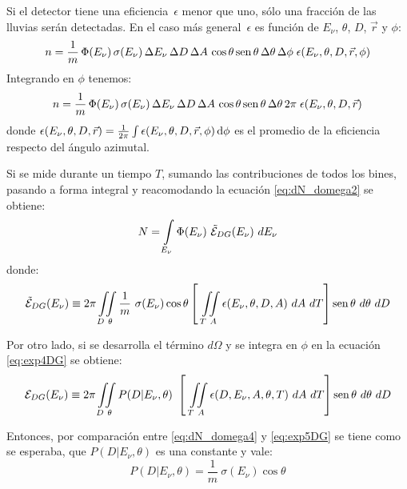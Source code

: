 	Si el detector tiene una eficiencia~$\epsilon$ menor que uno, sólo una fracción de las lluvias serán detectadas. En el caso más general~$\epsilon$ es función de $E_{\nu}$, $\theta$, $D$, $\vec{r}$ y $\phi$:
	\begin{equation}
	n = \frac{1}{m}\,\Phi(E_{\nu})\,\sigma(E_{\nu})\,\Delta E_{\nu}\,\Delta D\,\Delta A\,\cos\theta\operatorname{sen}\theta\,\Delta\theta\,\Delta\phi\;\epsilon(E_{\nu},\theta,D,\vec{r},\phi)
	\label{eq:dN_domega}
	\end{equation}
	Integrando en $\phi$ tenemos:
	\begin{equation}
	n = \frac{1}{m}\,\Phi(E_{\nu})\,\sigma(E_{\nu})\,\Delta E_{\nu}\,\Delta D\,\Delta A\,\cos\theta\operatorname{sen}\theta\,\Delta\theta\,2\pi\;\epsilon(E_{\nu},\theta,D,\vec{r})
	\label{eq:dN_domega2}
	\end{equation}
	donde $\epsilon(E_{\nu},\theta,D,\vec{r}) = \frac{1}{2\pi}\int \epsilon(E_{\nu},\theta,D,\vec{r},\phi)\,{\rm d}\phi$ es el promedio de la eficiencia respecto del ángulo azimutal. 

	Si se mide durante un tiempo $T$, sumando las contribuciones de todos los bines, pasando a forma integral y reacomodando la ecuación \ref{eq:dN_domega2} se obtiene:
	\begin{equation}
	N = \int\limits_{E_\nu}\Phi(E_{\nu})~
	\tilde{\cal E}_{DG}(E_{\nu})
	~dE_\nu
	\label{eq:dN_domega3}
	\end{equation}
	donde:
	\begin{equation}
	\tilde{\cal E}_{DG}(E_{\nu})
	\equiv 2\pi\iint\limits_{D~\theta}\frac{1}{m}~\sigma(E_{\nu})\cos\theta
		\left[
			~\iint\limits_{T~A} \epsilon(E_{\nu},\theta,D,A)~dA~dT
		\right]
		\operatorname{sen}\theta~d\theta~dD
	\label{eq:dN_domega4}
	\end{equation}
	
	Por otro lado, si se desarrolla el término $d\Omega$ y se integra en $\phi$ en la ecuación \ref{eq:exp4DG} se obtiene:
	\begin{equation}
	{\cal E}_{DG}(E_\nu)\equiv2\pi\iint\limits_{D~\theta}P(D|E_{\nu},\theta)~
	 \left[~
	 \iint\limits_{T~A}\epsilon(D,E_{\nu},A,\theta,T)~dA~dT
	 \right]
	 \operatorname{sen}\theta~d\theta~dD
	\label{eq:exp5DG}
	\end{equation}
	
	Entonces, por comparación entre \ref{eq:dN_domega4} y \ref{eq:exp5DG} se tiene como se esperaba, que $P(D|E_{\nu},\theta)$ es una constante y vale:
	\begin{equation}
	 P(D|E_{\nu},\theta) = \frac{1}{m}~\sigma(E_{\nu})\cos\theta
	\end{equation}
	
